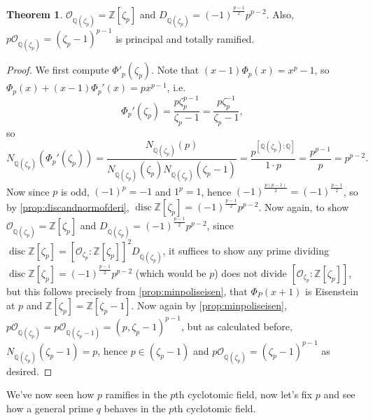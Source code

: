 \documentclass{article}
\newcommand{\Z}{\mathbb{Z}}
\newcommand{\Q}{\mathbb{Q}}
\newcommand{\disc}{\operatorname{disc}}
\newcommand{\ri}{\mathcal{O}}
\theoremstyle{definition}
\newtheorem{thm}[defn]{Theorem}
\begin{document}
\begin{thm}
\label{thm:ptotraminpthcycf}
$\ri_{\Q(\zeta_p)}=\Z[\zeta_p]$ and $D_{\Q(\zeta_p)}=(-1)^{\frac{p-1}{2}}p^{p-2}$. Also, $p\ri_{\Q(\zeta_p)}=(\zeta_p-1)^{p-1}$ is principal and totally ramified.
\end{thm}
\begin{proof}
We first compute $\Phi'_p(\zeta_p)$. Note that $(x-1)\Phi_p(x)=x^p-1$, so $\Phi_p(x)+(x-1)\Phi_p'(x)=px^{p-1}$, i.e.
\[
\Phi_p'(\zeta_p)=\frac{p\zeta_p^{p-1}}{\zeta_p-1}=\frac{p\zeta_p^{-1}}{\zeta_p-1},
\]
so
\[
N_{\Q(\zeta_p)}(\Phi_p'(\zeta_p))=\frac{N_{\Q(\zeta_p)}(p)}{N_{\Q(\zeta_p)}(\zeta_p)N_{\Q(\zeta_p)}(\zeta_p-1)}=\frac{p^{\left[\Q(\zeta_p):\Q\right]}}{1\cdot p}=\frac{p^{p-1}}{p}=p^{p-2}.
\]
Now since $p$ is odd, $(-1)^p=-1$ and $1^p=1$, hence $(-1)^{\frac{p(p-1)}{2}}=(-1)^{\frac{p-1}{2}}$, so by \ref{prop:discandnormofderi}, $\disc\Z[\zeta_p]=(-1)^{\frac{p-1}{2}}p^{p-2}$. Now again, to show $\ri_{\Q(\zeta_p)}=\Z[\zeta_p]$ and $D_{\Q(\zeta_p)}=(-1)^{\frac{p-1}{2}}p^{p-2}$, since $\disc\Z[\zeta_p]=\left[\ri_{\zeta_p}:\Z[\zeta_p]\right]^2D_{\Q(\zeta_p)}$, it suffices to show any prime dividing $\disc\Z[\zeta_p]=(-1)^{\frac{p-1}{2}}p^{p-2}$ (which would be $p$) does not divide $\left[\ri_{\zeta_p}:\Z[\zeta_p]\right]$, but this follows precisely from \ref{prop:minpoliseisen}, that $\Phi_P(x+1)$ is Eisenstein at $p$ and $\Z[\zeta_p]=\Z[\zeta_p-1]$. Now again by \ref{prop:minpoliseisen}, $p\ri_{\Q(\zeta_p)}=p\ri_{\Q(\zeta_p-1)}=(p,\zeta_p-1)^{p-1}$, but as calculated before, $N_{\Q(\zeta_p)}(\zeta_p-1)=p$, hence $p\in(\zeta_p-1)$ and $p\ri_{\Q(\zeta_p)}=(\zeta_p-1)^{p-1}$ as desired.
\end{proof}

We've now seen how $p$ ramifies in the $p$th cyclotomic field, now let's fix $p$ and see how a general prime $q$ behaves in the $p$th cyclotomic field.
\end{document}
